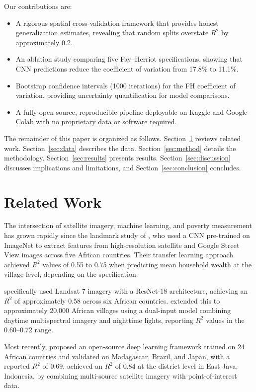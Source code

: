 \documentclass[11pt,a4paper]{article}
\newcommand{\Rtwo}{\ensuremath{R^2}}
\begin{document}
Our contributions are:
\begin{itemize}
    \item A rigorous spatial cross-validation framework that provides honest generalization estimates, revealing that random splits overstate \Rtwo{} by approximately 0.2.
    \item An ablation study comparing five Fay--Herriot specifications, showing that CNN predictions reduce the coefficient of variation from 17.8\% to 11.1\%.
    \item Bootstrap confidence intervals (1000 iterations) for the FH coefficient of variation, providing uncertainty quantification for model comparisons.
    \item A fully open-source, reproducible pipeline deployable on Kaggle and Google Colab with no proprietary data or software required.
\end{itemize}

\noindent The remainder of this paper is organized as follows. Section~\ref{sec:lit} reviews related work. Section~\ref{sec:data} describes the data. Section~\ref{sec:method} details the methodology. Section~\ref{sec:results} presents results. Section~\ref{sec:discussion} discusses implications and limitations, and Section~\ref{sec:conclusion} concludes.

\section{Related Work}
\label{sec:lit}

The intersection of satellite imagery, machine learning, and poverty measurement has grown rapidly since the landmark study of \citet{jean2016}, who used a CNN pre-trained on ImageNet to extract features from high-resolution satellite and Google Street View images across five African countries. Their transfer learning approach achieved \Rtwo{} values of 0.55 to 0.75 when predicting mean household wealth at the village level, depending on the specification.

\citet{perez2017} specifically used Landsat 7 imagery with a ResNet-18 architecture, achieving an \Rtwo{} of approximately 0.58 across six African countries. \citet{yeh2020} extended this to approximately 20,000 African villages using a dual-input model combining daytime multispectral imagery and nighttime lights, reporting \Rtwo{} values in the 0.60--0.72 range.

Most recently, \citet{deepwealth2024} proposed an open-source deep learning framework trained on 24 African countries and validated on Madagascar, Brazil, and Japan, with a reported \Rtwo{} of 0.69. \citet{putri2023} achieved an \Rtwo{} of 0.84 at the district level in East Java, Indonesia, by combining multi-source satellite imagery with point-of-interest data.
\end{document}
